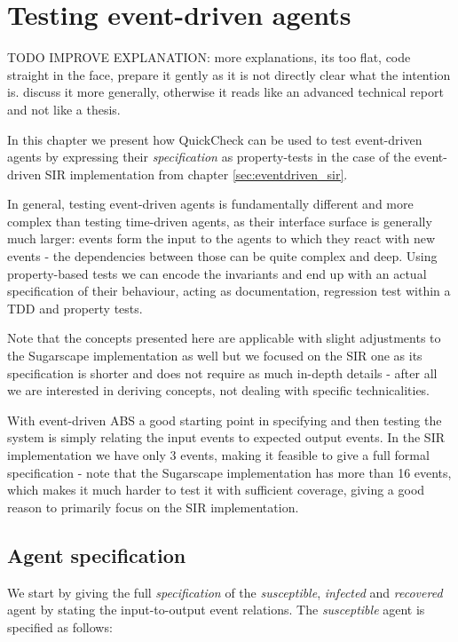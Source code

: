 \chapter{Testing event-driven agents}

TODO IMPROVE EXPLANATION: more explanations, its too flat, code straight in the face, prepare it gently as it is not directly clear what the intention is. discuss it more generally, otherwise it reads like an advanced technical report and not like a thesis.

In this chapter we present how QuickCheck can be used to test event-driven agents by expressing their \textit{specification} as property-tests in the case of the event-driven SIR implementation from chapter \ref{sec:eventdriven_sir}.

In general, testing event-driven agents is fundamentally different and more complex than testing time-driven agents, as their interface surface is generally much larger: events form the input to the agents to which they react with new events - the dependencies between those can be quite complex and deep. Using property-based tests we can encode the invariants and end up with an actual specification of their behaviour, acting as documentation, regression test within a TDD and property tests.

Note that the concepts presented here are applicable with slight adjustments to the Sugarscape implementation as well but we focused on the SIR one as its specification is shorter and does not require as much in-depth details - after all we are interested in deriving concepts, not dealing with specific technicalities.

With event-driven ABS a good starting point in specifying and then testing the system is simply relating the input events to expected output events. In the SIR implementation we have only 3 events, making it feasible to give a full formal specification - note that the Sugarscape implementation has more than 16 events, which makes it much harder to test it with sufficient coverage, giving a good reason to primarily focus on the SIR implementation. 

\section{Agent specification}
We start by giving the full \textit{specification} of the \textit{susceptible}, \textit{infected} and \textit{recovered} agent by stating the input-to-output event relations. The \textit{susceptible} agent is specified as follows:

